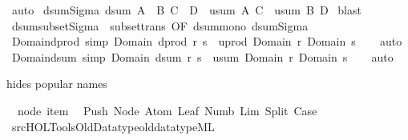 \begin{isabellebody}
%
\isadelimproof
%
\endisadelimproof
%
\isatagproof
{}\isamarkupfalse%
\ auto%
\endisatagproof
{\isafoldproof}%
%
\isadelimproof
\isanewline
%
\endisadelimproof
\isanewline
{}\isamarkupfalse%
\ dsum{\isacharunderscore}Sigma{\isacharcolon}\ {\isachardoublequoteopen}{\isacharparenleft}dsum\ {\isacharparenleft}A\ {\isasymtimes}\ B{\isacharparenright}\ {\isacharparenleft}C\ {\isasymtimes}\ D{\isacharparenright}{\isacharparenright}\ {\isacharless}{\isacharequal}\ {\isacharparenleft}usum\ A\ C{\isacharparenright}\ {\isasymtimes}\ {\isacharparenleft}usum\ B\ D{\isacharparenright}{\isachardoublequoteclose}\isanewline
%
\isadelimproof
%
\endisadelimproof
%
\isatagproof
{}\isamarkupfalse%
\ blast%
\endisatagproof
{\isafoldproof}%
%
\isadelimproof
\isanewline
%
\endisadelimproof
\isanewline
{}\isamarkupfalse%
\ dsum{\isacharunderscore}subset{\isacharunderscore}Sigma\ {\isacharequal}\ subset{\isacharunderscore}trans\ {\isacharbrackleft}OF\ dsum{\isacharunderscore}mono\ dsum{\isacharunderscore}Sigma{\isacharbrackright}\isanewline
\isanewline
\isanewline
\isanewline
\isanewline
{}\isamarkupfalse%
\ Domain{\isacharunderscore}dprod\ {\isacharbrackleft}simp{\isacharbrackright}{\isacharcolon}\ {\isachardoublequoteopen}Domain\ {\isacharparenleft}dprod\ r\ s{\isacharparenright}\ {\isacharequal}\ uprod\ {\isacharparenleft}Domain\ r{\isacharparenright}\ {\isacharparenleft}Domain\ s{\isacharparenright}{\isachardoublequoteclose}\isanewline
%
\isadelimproof
\ \ %
\endisadelimproof
%
\isatagproof
{}\isamarkupfalse%
\ auto%
\endisatagproof
{\isafoldproof}%
%
\isadelimproof
\isanewline
%
\endisadelimproof
\isanewline
{}\isamarkupfalse%
\ Domain{\isacharunderscore}dsum\ {\isacharbrackleft}simp{\isacharbrackright}{\isacharcolon}\ {\isachardoublequoteopen}Domain\ {\isacharparenleft}dsum\ r\ s{\isacharparenright}\ {\isacharequal}\ usum\ {\isacharparenleft}Domain\ r{\isacharparenright}\ {\isacharparenleft}Domain\ s{\isacharparenright}{\isachardoublequoteclose}\isanewline
%
\isadelimproof
\ \ %
\endisadelimproof
%
\isatagproof
{}\isamarkupfalse%
\ auto%
\endisatagproof
{\isafoldproof}%
%
\isadelimproof
%
\endisadelimproof
%
\begin{isamarkuptext}%
hides popular names%
\end{isamarkuptext}\isamarkuptrue%
\isamarkupfalse%
\ {\isacharparenleft}\ node\ item\isanewline
{}\isamarkupfalse%
\ {\isacharparenleft}\ Push\ Node\ Atom\ Leaf\ Numb\ Lim\ Split\ Case\isanewline
%
\isadelimML
\isanewline
%
\endisadelimML
%
\isatagML
{}\isamarkupfalse%
\ {\isacartoucheopen}{\isachartilde}{\isachartilde}{\isacharslash}src{\isacharslash}HOL{\isacharslash}Tools{\isacharslash}Old{\isacharunderscore}Datatype{\isacharslash}old{\isacharunderscore}datatype{\isachardot}ML{\isacartoucheclose}%
\endisatagML
{\isafoldML}%
%
\isadelimML
\isanewline
%
\endisadelimML
%
\isadelimtheory
\isanewline
%
\endisadelimtheory
%
\isatagtheory
{}\isamarkupfalse%
%
\endisatagtheory
{\isafoldtheory}%
%
\isadelimtheory
%
\endisadelimtheory
%
\end{isabellebody}%
